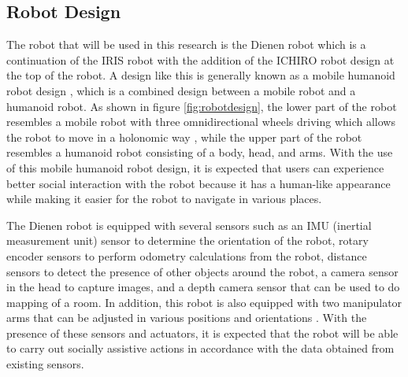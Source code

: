 \subsection{Robot Design}
\label{subsec:robotdesign}



The robot that will be used in this research is the Dienen robot which is a continuation of the IRIS robot \citep{dikairono2020}\citep{zanuar2019} with the addition of the ICHIRO robot \citep{muhtadin2019} design at the top of the robot.
A design like this is generally known as a mobile humanoid robot design \citep{mohamed2012},
  which is a combined design between a mobile robot and a humanoid robot.
As shown in figure \ref{fig:robotdesign},
  the lower part of the robot resembles a mobile robot with three omnidirectional wheels driving which allows the robot to move in a holonomic way \citep{oliveira2008},
  while the upper part of the robot resembles a humanoid robot consisting of a body, head, and arms.
With the use of this mobile humanoid robot design,
  it is expected that users can experience better social interaction with the robot because it has a human-like appearance \citep{rossi2018} while making it easier for the robot to navigate in various places.

The Dienen robot is equipped with several sensors such as an IMU (inertial measurement unit) sensor to determine the orientation of the robot,
  rotary encoder sensors to perform odometry calculations from the robot,
  distance sensors to detect the presence of other objects around the robot,
  a camera sensor in the head to capture images,
  and a depth camera sensor that can be used to do mapping of a room.
In addition, this robot is also equipped with two manipulator arms that can be adjusted in various positions and orientations \citep{iqbal2012}.
With the presence of these sensors and actuators,
  it is expected that the robot will be able to carry out socially assistive actions in accordance with the data obtained from existing sensors.
